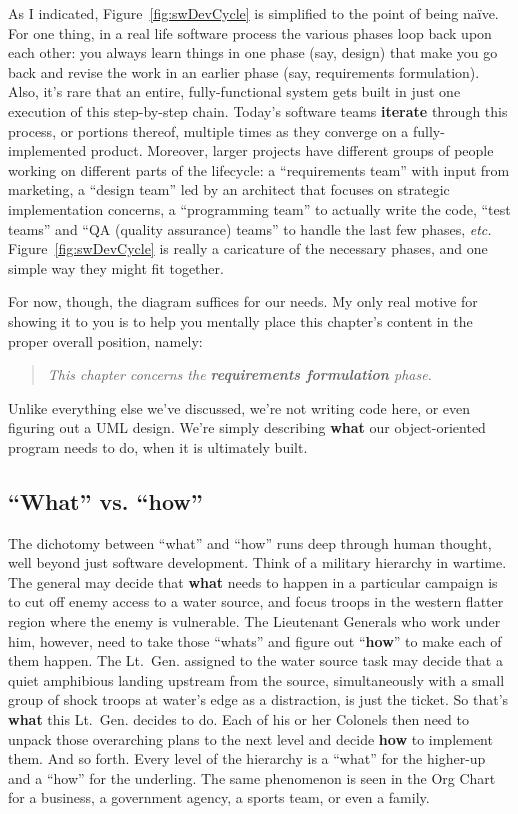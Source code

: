 As I indicated, Figure~\ref{fig:swDevCycle} is simplified to the point of
being na\"{i}ve. For one thing, in a real life software process the various
phases loop back upon each other: you always learn things in one phase (say,
design) that make you go back and revise the work in an earlier phase (say,
requirements formulation). Also, it's rare that an entire, fully-functional
system gets built in just one execution of this step-by-step chain. Today's
software teams \textbf{iterate} through this process, or portions thereof,
multiple times as they converge on a fully-implemented product. Moreover,
larger projects have different groups of people working on different parts of
the lifecycle: a ``requirements team'' with input from marketing, a ``design
team'' led by an architect that focuses on strategic implementation concerns,
a ``programming team'' to actually write the code, ``test teams'' and ``QA
(quality assurance) teams'' to handle the last few phases, \textit{etc.}
Figure~\ref{fig:swDevCycle} is really a caricature of the necessary phases,
and one simple way they might fit together.

For now, though, the diagram suffices for our needs. My only real motive for
showing it to you is to help you mentally place this chapter's content in the
proper overall position, namely:

\begin{quote}
\textit{This chapter concerns the \textbf{requirements formulation} phase.}
\end{quote} 

Unlike everything else we've discussed, we're not writing code here, or even
figuring out a UML design. We're simply describing \textbf{what} our
object-oriented program needs to do, when it is ultimately built.

\subsection{``What'' vs. ``how''}

The dichotomy between ``what'' and ``how'' runs deep through human thought,
well beyond just software development. Think of a military hierarchy in
wartime. The general may decide that \textbf{what} needs to happen in a
particular campaign is to cut off enemy access to a water source, and focus
troops in the western flatter region where the enemy is vulnerable. The
Lieutenant Generals who work under him, however, need to take those ``whats''
and figure out ``\textbf{how}'' to make each of them happen. The Lt.~Gen.
assigned to the water source task may decide that a quiet amphibious landing
upstream from the source, simultaneously with a small group of shock troops at
water's edge as a distraction, is just the ticket. So that's \textbf{what}
this Lt.~Gen. decides to do. Each of his or her Colonels then need to unpack
those overarching plans to the next level and decide \textbf{how} to implement
them. And so forth. Every level of the hierarchy is a ``what'' for the
higher-up and a ``how'' for the underling. The same phenomenon is seen in the
Org Chart for a business, a government agency, a sports team, or even a
family.

